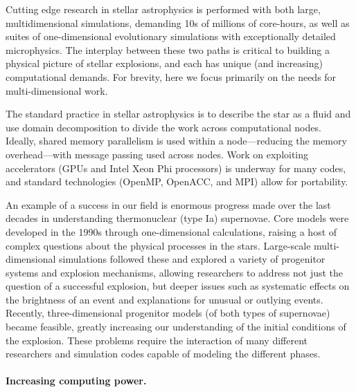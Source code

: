 \documentclass[11pt,twocolumn]{article}
\begin{document}
Cutting edge research in stellar astrophysics is performed with both
large, multidimensional simulations, demanding 10s of millions of
core-hours, as well as suites of one-dimensional evolutionary
simulations with exceptionally detailed microphysics.  The interplay
between these two paths is critical to building a physical picture
of stellar explosions, and each has unique (and increasing)
computational demands.  For brevity, here we focus primarily on the
needs for multi-dimensional work.

The standard practice in stellar astrophysics is to describe the star
as a fluid and use domain decomposition to divide the work across
computational nodes.  Ideally, shared memory parallelism is used
within a node---reducing the memory overhead---with message
passing used across nodes.  Work on exploiting accelerators (GPUs and
Intel Xeon Phi processors) is underway for many codes, and standard
technologies (OpenMP, OpenACC, and MPI) allow for portability.

An example of a success in our field is enormous progress made over
the last decades in understanding thermonuclear (type Ia) supernovae.
Core models were developed in the 1990s through one-dimensional
calculations, raising a host of complex questions about the physical
processes in the stars.  Large-scale multi-dimensional simulations
followed these and explored a variety of progenitor systems and explosion
mechanisms, allowing researchers to address not just the question of a
successful explosion, but deeper issues such as systematic effects on
the brightness of an event and explanations for unusual or outlying
events.  Recently, three-dimensional progenitor models (of both types
of supernovae) became feasible, greatly increasing our understanding
of the initial conditions of the explosion.  These problems require
the interaction of many different researchers and simulation codes
capable of modeling the different phases.

\paragraph*{Increasing computing power.}
\end{document}

